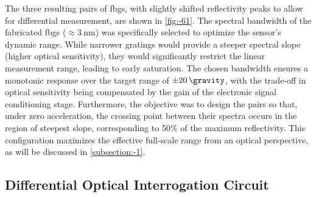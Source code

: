 \documentclass[sensors,article,accept,pdftex,moreauthors]{Definitions/mdpi}
\begin{document}
The three resulting pairs of \glspl{fbg}, with slightly shifted reflectivity peaks to allow for differential measurement, are shown in \cref{fig:-61}. The spectral bandwidth of the fabricated \glspl{fbg} ($\approx$$\SI{3}{\nano\meter}$) was specifically selected to optimize the sensor's dynamic range. While narrower gratings would provide a steeper spectral slope (higher optical sensitivity), they would significantly restrict the linear measurement range, leading to early saturation. The chosen bandwidth ensures a monotonic response over the target range of $\pm \SI{20}{\gravity}$, with the trade-off in optical sensitivity being compensated by the gain of the electronic signal conditioning stage. Furthermore, the objective was to design the pairs so that, under zero acceleration, the crossing point between their spectra occurs in the region of steepest slope, corresponding to {50}\% of the maximum reflectivity. This configuration maximizes the effective full-scale range from an optical perspective, as will be discussed in \cref{subsection:-1}.






\subsection{Differential Optical Interrogation Circuit}
\end{document}
